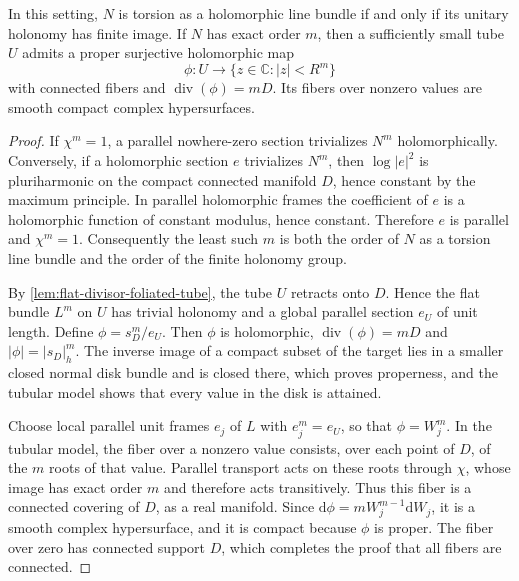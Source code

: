 \begin{proposition}\label{prop:flat-divisor-finite-holonomy}
In this setting, $N$ is torsion as a holomorphic line bundle if and only if its unitary holonomy has finite image. If $N$ has exact order $m$, then a sufficiently small tube $U$ admits a proper surjective holomorphic map
\[
 \phi\colon U\longrightarrow\{z\in\mathbb C:|z|<R^m\}
\]
with connected fibers and $\operatorname{div}(\phi)=mD$. Its fibers over nonzero values are smooth compact complex hypersurfaces.
\end{proposition}
\begin{proof}
If $\chi^m=1$, a parallel nowhere-zero section trivializes $N^m$ holomorphically. Conversely, if a holomorphic section $e$ trivializes $N^m$, then $\log|e|^2$ is pluriharmonic on the compact connected manifold $D$, hence constant by the maximum principle. In parallel holomorphic frames the coefficient of $e$ is a holomorphic function of constant modulus, hence constant. Therefore $e$ is parallel and $\chi^m=1$. Consequently the least such $m$ is both the order of $N$ as a torsion line bundle and the order of the finite holonomy group.

By \cref{lem:flat-divisor-foliated-tube}, the tube $U$ retracts onto $D$. Hence the flat bundle $L^m$ on $U$ has trivial holonomy and a global parallel section $e_U$ of unit length. Define $\phi=s_D^m/e_U$. Then $\phi$ is holomorphic, $\operatorname{div}(\phi)=mD$ and $|\phi|=|s_D|_h^m$. The inverse image of a compact subset of the target lies in a smaller closed normal disk bundle and is closed there, which proves properness, and the tubular model shows that every value in the disk is attained.

Choose local parallel unit frames $e_j$ of $L$ with $e_j^m=e_U$, so that $\phi=W_j^m$. In the tubular model, the fiber over a nonzero value consists, over each point of $D$, of the $m$ roots of that value. Parallel transport acts on these roots through $\chi$, whose image has exact order $m$ and therefore acts transitively. Thus this fiber is a connected covering of $D$, as a real manifold. Since $\mathrm d\phi=mW_j^{m-1}\mathrm dW_j$, it is a smooth complex hypersurface, and it is compact because $\phi$ is proper. The fiber over zero has connected support $D$, which completes the proof that all fibers are connected.
\end{proof}

